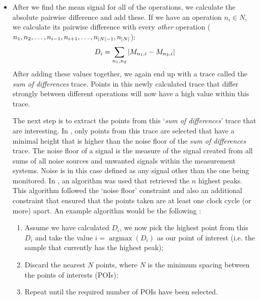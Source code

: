 \begin{itemize}
\begin{itemize}
		\item After we find the mean signal for all of the operations, we calculate the absolute pairwise difference and add these. 
		If we have an operation $n_i \in N$, we calculate its pairwise difference with every \emph{other} operation ($n_1, n_2, \ldots, n_{i - 1}, n_{i + 1}, \ldots, n_{\abs{N} - 1}, n_{\abs{N}}$):
		\begin{equation*}
		D_i = \sum_{n_1, n_2} \abs{M_{n_1, i} - M_{n_2, i}}
		\end{equation*}
		After adding these values together, we again end up with a trace called the \emph{sum of differences} trace. 
		Points in this newly calculated trace that differ strongly between different operations will now have a high value within this trace.

		The next step is to extract the points from this `\emph{sum of differences}' trace that are interesting. 
		In \cite{rechberger2004practical}, only points from this trace are selected that have a minimal height that is higher than the noise floor of the \emph{sum of differences} trace.
		The noise floor of a signal is the measure of the signal created from all sums of all noise sources and unwanted signals within the measurement systems.
		Noise is in this case defined as any signal other than the one being monitored.	
		In \cite{rechberger2004practical}, an algorithm was used that retrieved the $n$ highest peaks.
		This algorithm followed the `noise floor' constraint and also an additional constraint that ensured that the points taken are at least one clock cycle (or more) apart.
		An example algorithm would be the following \cite{whisperer2018template}:
		\begin{enumerate}
			\item Assume we have calculated $D_i$, we now pick the highest point from this $D_i$ and take the value $i = \operatorname{argmax}(D_i)$ as our point of interest (i.e. the sample that currently has the highest peak);
			\item Discard the nearest $N$ points, where $N$ is the minimum spacing between the points of interests (POIs);
			\item Repeat until the required number of POIs have been selected.
		\end{enumerate}

	\end{itemize}
\end{itemize}
%

